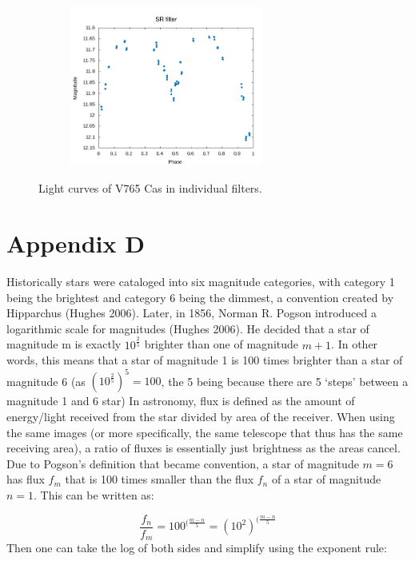 \documentclass[linenumbers]{aastex631}
\begin{document}
\begin{figure}[H]
\begin{subfigure}{}
  \end{subfigure}
  \begin{subfigure}{}
    \includegraphics[width=2.5in]{Figures/SR.png}
  \end{subfigure}
  \caption{Light curves of V765 Cas in individual filters.}
  \label{fig:indivlightcurves}
\end{figure}

\section{Appendix D} \label{appd}

\noindent
Historically stars were cataloged into six magnitude categories, with category 1 being the brightest and category 6 being the dimmest, a convention created by Hipparchus (Hughes 2006). Later, in 1856, Norman R. Pogson introduced a logarithmic scale for magnitudes (Hughes 2006). He decided that a star of magnitude m is exactly $10^{\frac 2 5}$ brighter than one of magnitude $m+1$. In other words, this means that a star of magnitude 1 is 100 times brighter than a star of magnitude 6 (as $(10^{\frac 2 5})^5 = 100$, the 5 being because there are 5 ‘steps’ between a magnitude 1 and 6 star)
\newline \newline
In astronomy, flux is defined as the amount of energy/light received from the star divided by area of the receiver. When using the same images (or more specifically, the same telescope that thus has the same receiving area), a ratio of fluxes is essentially just brightness as the areas cancel. 
\newline \newline
Due to Pogson’s definition that became convention, a star of magnitude $m=6$ has flux $f_m$ that is 100 times smaller than the flux $f_n$ of a star of magnitude $n=1$. This can be written as: 

\begin{equation}
    \frac{f_n}{f_m} = 100 ^ {(\frac{m-n}{5}} = (10^2 )^ {(\frac{m-n}{5}}
\end{equation}
Then one can take the log of both sides and simplify using the exponent rule: 
\end{document}
